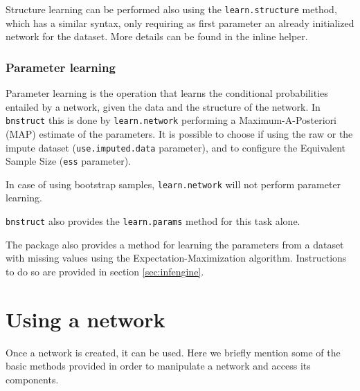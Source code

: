 \documentclass{article}\usepackage[]{graphicx}\usepackage[]{color}
\newcommand{\Robject}[1]{{\texttt{#1}}}
\newcommand{\Rpackage}[1]{{\texttt{#1}}}
\newcommand{\Rmethod}[1]{{\texttt{#1}}}
\newcommand{\Rfunarg}[1]{{\texttt{#1}}}
\begin{document}
Structure learning can be performed also using the \Rmethod{learn.structure} method, which has a similar syntax, only requiring as
first parameter an already initialized network for the dataset. More details can be found in the inline helper.

\subsubsection{Parameter learning}
Parameter learning is the operation that learns the conditional probabilities entailed by a network,
given the data and the structure of the network. In \Rpackage{bnstruct} this is done by \Rmethod{learn.network}
performing a Maximum-A-Posteriori (MAP) estimate of the parameters. It is possible to choose if using the raw
or the impute dataset (\Rfunarg{use.imputed.data} parameter), and to configure the
Equivalent Sample Size (\Rfunarg{ess} parameter).

In case of using bootstrap samples, \Rmethod{learn.network} will not perform parameter learning.

\Rpackage{bnstruct} also provides the \Rmethod{learn.params} method for this task alone.

The package also provides a method for learning the parameters from a dataset with missing values using the 
Expectation-Maximization algorithm. Instructions to do so are provided in section \ref{sec:infengine}.

% 

\section{Using a network}
Once a network is created, it can be used. Here we briefly mention some of the basic methods provided in order to
manipulate a network and access its components.
\end{document}
